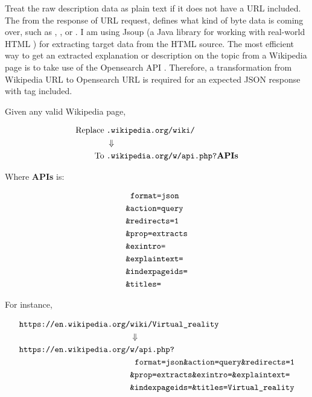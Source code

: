 Treat the raw description data as plain text if it does not have a URL included. The\; from the response of URL request, defines what kind of byte data is coming over, such as , , or . I am using Jsoup (a Java library for working with real-world HTML \cite{joup.2016}) for extracting target data from the HTML source. The most efficient way to get an extracted explanation or description on the topic from a Wikipedia page is to take use of the Opensearch API \cite{wiki.api.2016}. Therefore, a transformation from Wikipedia URL to Opensearch URL is required for an expected JSON response with  tag included.

Given any valid Wikipedia page,

\[
\begin{array}{lr}
\begin{aligned}
\text{Replace}\;&\texttt{.wikipedia.org/wiki/}\\
&\Downarrow\\
\text{To}\;&\texttt{.wikipedia.org/w/api.php?}\textbf{APIs}\\
\end{aligned}
\end{array}
\]

Where \textbf{APIs} is:

\[
\begin{array}{lr}
\begin{aligned}
&\;\;\texttt{format=json}\\
&\texttt{\&action=query}\\
&\texttt{\&redirects=1}\\
&\texttt{\&prop=extracts}\\
&\texttt{\&exintro=}\\
&\texttt{\&explaintext=}\\
&\texttt{\&indexpageids=}\\
&\texttt{\&titles=}\\
\end{aligned}
\end{array}
\]

For instance,

\[
\begin{array}{lr}
\begin{aligned}
\texttt{https://en.wikipedia.org/}&\texttt{wiki/Virtual\_reality}\\
&\Downarrow\\
\texttt{https://en.wikipedia.org/}&\texttt{w/api.php?}\\
&\;\;\texttt{format=json\&action=query\&redirects=1}\\
&\texttt{\&prop=extracts\&exintro=\&explaintext=}\\
&\texttt{\&indexpageids=\&titles=Virtual\_reality}\\
\end{aligned}
\end{array}
\]

